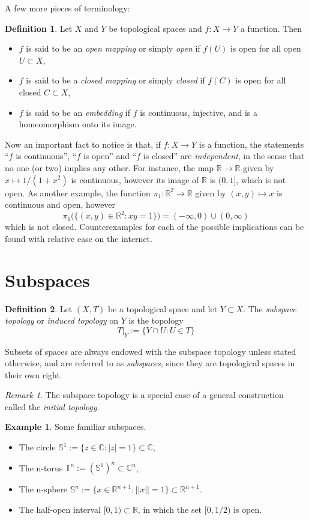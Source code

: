\documentclass{book}
\theoremstyle{definition}
\newtheorem{definition}{Definition}[section]
\newtheorem{example}{Example}[section]
\theoremstyle{remark}
\newtheorem{remark}{Remark}[section]
\newcommand{\R}{\mathbb{R}}
\newcommand{\C}{\mathbb{C}}
\newcommand{\T}{\mathbb{T}}
\begin{document}
A few more pieces of terminology:
\begin{definition}
Let $X$ and $Y$ be topological spaces and $f:X\to Y$ a function. Then
\begin{itemize}
    \item $f$ is said to be an \textit{open mapping} or simply \textit{open} if $f(U)$ is open for all open $U\subset X$,
    \item $f$ is said to be a \textit{closed mapping} or simply \textit{closed} if $f(C)$ is open for all closed $C\subset X$,
    \item $f$ is said to be an \textit{embedding} if $f$ is continuous, injective, and is a homeomorphism onto its image.
\end{itemize}
\end{definition}
Now an important fact to notice is that, if $f:X\to Y$ is a function, the statements ``$f$ is continuous'', ``$f$ is open'' and ``$f$ is closed'' are \textit{independent}, in the sense that no one (or two) implies any other. For instance, the map $\R\to\R$ given by $x\mapsto 1/(1+x^2)$ is continuous, however its image of $\R$ is $(0,1]$, which is not open. As another example, the function $\pi_1:\R^2\to\R$ given by $(x,y)\mapsto x$ is continuous and open, however
$$\pi_1\big(\{(x,y)\in\R^2:xy=1\}\big)=(-\infty,0)\cup(0,\infty)$$
which is not closed. Counterexamples for each of the possible implications can be found with relative ease on the internet.

\section{Subspaces}

\begin{definition}
Let $(X,T)$ be a topological space and let $Y\subset X$. The \textit{subspace topology} or \textit{induced topology} on $Y$ is the topology
$$T|_Y:=\{Y\cap U:U\in T\}$$
\end{definition}

Subsets of spaces are always endowed with the subspace topology unless stated otherwise, and are referred to as \textit{subspaces}, since they are topological spaces in their own right. 
\begin{remark}
The subspace topology is a special case of a general construction called the \textit{initial topology}.
\end{remark}

\begin{example} Some familiar subspaces.
\begin{itemize}
    \item The circle $\mathbb S^1:=\{z\in\C:|z|=1\}\subset\C$,
    \item The n-torus $\T^n:=(\mathbb S^1)^n\subset\C^n$,
    \item The n-sphere $\mathbb S^n:=\{x\in\R^{n+1}:||x||=1\}\subset\R^{n+1}$.
    \item The half-open interval $[0,1)\subset\R$, in which the set $[0,1/2)$ is open.
\end{itemize}
\end{example}
\end{document}
